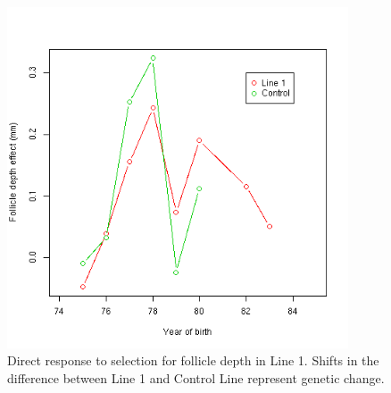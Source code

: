 %

\begin{figure}[!htp]
  \centering
   \includegraphics[width=0.9\textwidth]{dgl1.png}
  \caption{Direct response to selection for follicle depth in Line 1. Shifts in the difference between Line 1 and Control Line represent genetic change.}
  \label{fig:dgl1}
\end{figure}

%

